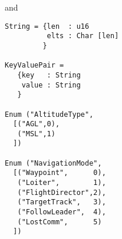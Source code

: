 \documentclass[sigplan,10pt,anonymous,review]{acmart}\settopmatter{printfolios=true,printccs=false,printacmref=false}
\begin{document}
\begin{enumerate}
\noindent and
\begin{verbatim}
String = {len  : u16
          elts : Char [len]
         }

KeyValuePair =
   {key   : String
    value : String
   }

Enum ("AltitudeType",
  [("AGL",0),
   ("MSL",1)
  ])

Enum ("NavigationMode",
  [("Waypoint",      0),
   ("Loiter",        1),
   ("FlightDirector",2),
   ("TargetTrack",   3),
   ("FollowLeader",  4),
   ("LostComm",      5)
  ])
\end{verbatim}

\end{enumerate}





\end{document}
